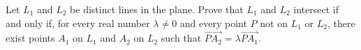 Let $L_1$ and $L_2$ be distinct lines in the plane. Prove that $L_1$ and $L_2$ intersect if and only if, for every
real number $\lambda\neq 0$ and every point $P$ not on $L_1$ or $L_2$, there exist points $A_1$ on $L_1$ and $A_2$
on $L_2$ such that $\overrightarrow{PA_2} = \lambda \overrightarrow{PA_1}$.

